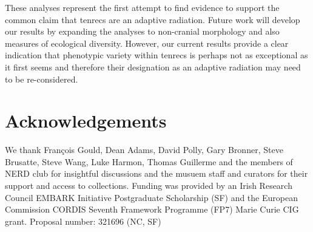 \documentclass[12pt,a4paper]{article}
\begin{document}

	These analyses represent the first attempt to find evidence to support the common claim that tenrecs are an adaptive radiation. Future work will develop our results by expanding the analyses to non-cranial morphology and also measures of ecological diversity. However, our current results provide a clear indication that phenotypic variety within tenrecs is perhaps not as exceptional as it first seems and therefore their designation as an adaptive radiation may need to be re-considered.




\section*{Acknowledgements}

	We thank Fran\c{c}ois Gould, Dean Adams, David Polly, Gary Bronner, Steve Brusatte, Steve Wang, Luke Harmon, Thomas Guillerme and the members of NERD club for insightful discussions and the musuem staff and curators for their support and access to collections. Funding was provided by an Irish Research Council EMBARK Initiative Postgraduate Scholarship (SF) and the European Commission CORDIS Seventh Framework Programme (FP7) Marie Curie CIG grant. Proposal number: 321696 (NC, SF)





\end{document}
